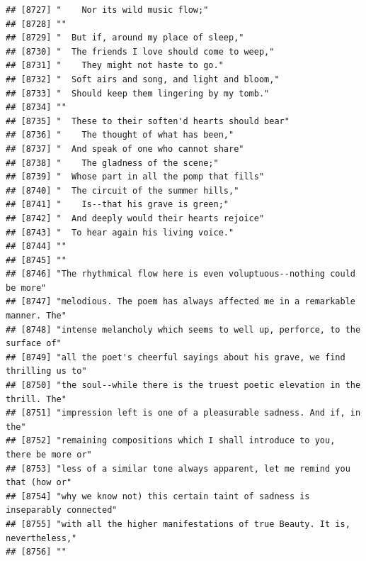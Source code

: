 \documentclass{article}\usepackage[]{graphicx}\usepackage[]{color}
\makeatletter
\newenvironment{kframe}{%
 \def\at@end@of@kframe{}%
 \ifinner\ifhmode%
  \def\at@end@of@kframe{\end{minipage}}%
  \begin{minipage}{\columnwidth}%
 \fi\fi%
 \def\FrameCommand##1{\hskip\@totalleftmargin \hskip-\fboxsep
 \colorbox{shadecolor}{##1}\hskip-\fboxsep
     \hskip-\linewidth \hskip-\@totalleftmargin \hskip\columnwidth}%
 \MakeFramed {\advance\hsize-\width
   \@totalleftmargin\z@ \linewidth\hsize
   \@setminipage}}%
 {\par\unskip\endMakeFramed%
 \at@end@of@kframe}
\newenvironment{knitrout}{}{} %
\makeatother
\begin{document}
\begin{knitrout}
\begin{kframe}
\begin{verbatim}
## [8727] "    Nor its wild music flow;"                                                
## [8728] ""                                                                            
## [8729] "  But if, around my place of sleep,"                                         
## [8730] "  The friends I love should come to weep,"                                   
## [8731] "    They might not haste to go."                                             
## [8732] "  Soft airs and song, and light and bloom,"                                  
## [8733] "  Should keep them lingering by my tomb."                                    
## [8734] ""                                                                            
## [8735] "  These to their soften'd hearts should bear"                                
## [8736] "    The thought of what has been,"                                           
## [8737] "  And speak of one who cannot share"                                         
## [8738] "    The gladness of the scene;"                                              
## [8739] "  Whose part in all the pomp that fills"                                     
## [8740] "  The circuit of the summer hills,"                                          
## [8741] "    Is--that his grave is green;"                                            
## [8742] "  And deeply would their hearts rejoice"                                     
## [8743] "  To hear again his living voice."                                           
## [8744] ""                                                                            
## [8745] ""                                                                            
## [8746] "The rhythmical flow here is even voluptuous--nothing could be more"          
## [8747] "melodious. The poem has always affected me in a remarkable manner. The"      
## [8748] "intense melancholy which seems to well up, perforce, to the surface of"      
## [8749] "all the poet's cheerful sayings about his grave, we find thrilling us to"    
## [8750] "the soul--while there is the truest poetic elevation in the thrill. The"     
## [8751] "impression left is one of a pleasurable sadness. And if, in the"             
## [8752] "remaining compositions which I shall introduce to you, there be more or"     
## [8753] "less of a similar tone always apparent, let me remind you that (how or"      
## [8754] "why we know not) this certain taint of sadness is inseparably connected"     
## [8755] "with all the higher manifestations of true Beauty. It is, nevertheless,"     
## [8756] ""                                                                            

\end{verbatim}
\end{kframe}
\end{knitrout}
\end{document}
